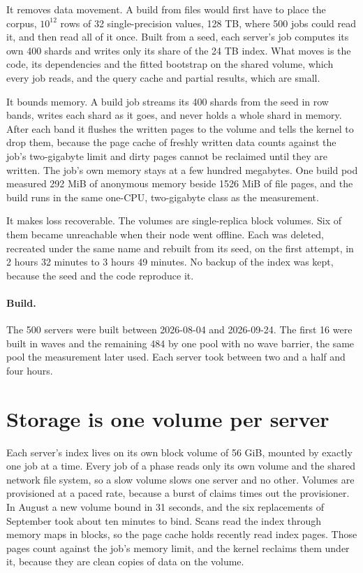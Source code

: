 \documentclass[sigconf, nonacm]{acmart}
\begin{document}
It removes data movement. A build from files would first have to place the corpus, $10^{12}$
rows of 32 single-precision values, 128 TB, where 500 jobs could read it, and then read all of it
once. Built from a seed, each server's job computes its own 400 shards and writes only its share
of the 24 TB index. What moves is the code, its dependencies and the fitted bootstrap on the
shared volume, which every job reads, and the query cache and partial results, which are small.

It bounds memory. A build job streams its 400 shards from the seed in row bands, writes each
shard as it goes, and never holds a whole shard in memory. After each band it flushes the written
pages to the volume and tells the kernel to drop them, because the page cache of freshly written
data counts against the job's two-gigabyte limit and dirty pages cannot be reclaimed until they
are written. The job's own memory stays at a few hundred megabytes. One build pod measured 292 MiB
of anonymous memory beside 1526 MiB of file pages, and the build runs in the same one-CPU,
two-gigabyte class as the measurement.

It makes loss recoverable. The volumes are single-replica block volumes. Six of them became
unreachable when their node went offline. Each was deleted, recreated under the same name and
rebuilt from its seed, on the first attempt, in 2 hours 32 minutes to 3 hours 49 minutes. No
backup of the index was kept, because the seed and the code reproduce it.

\paragraph{Build.} The 500 servers were built between 2026-08-04 and 2026-09-24. The first 16
were built in waves and the remaining 484 by one pool with no wave barrier, the same pool the
measurement later used. Each server took between two and a half and four hours.

\section{Storage is one volume per server}
\label{sec:storage}

Each server's index lives on its own block volume of 56 GiB, mounted by exactly one job at a
time. Every job of a phase reads only its own volume and the shared network file system, so a
slow volume slows one server and no other. Volumes are
provisioned at a paced rate, because a burst of claims times out the provisioner. In August a new
volume bound in 31 seconds, and the six replacements of September took about ten minutes to bind.
Scans read the index through memory maps in blocks, so the page cache holds recently read index
pages. Those pages count against the job's memory limit, and the kernel reclaims them under it,
because they are clean copies of data on the volume.
\end{document}
